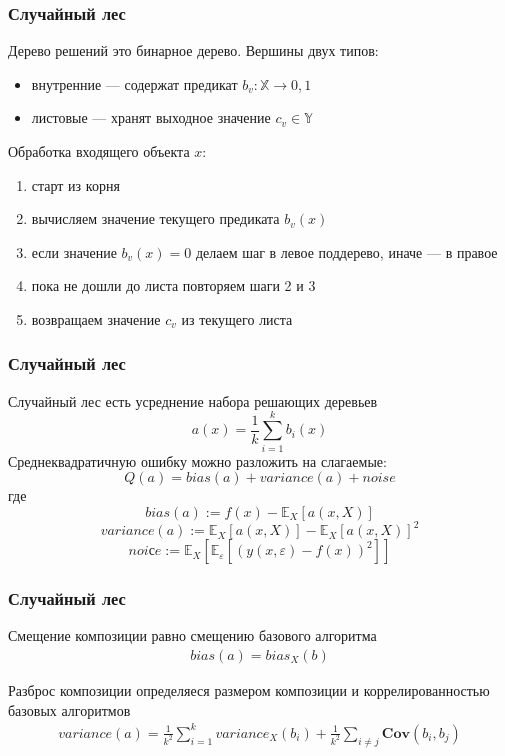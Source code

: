 \documentclass{beamer}
\newcommand{\COV}[2]{\textbf{Cov}\left(#1, #2\right)}
\renewcommand{\epsilon}{\varepsilon}
\begin{document}
\begin{frame}
    \frametitle{Случайный лес}

    Дерево решений это бинарное дерево.
    Вершины двух типов:
    \begin{itemize}
        \item внутренние --- содержат предикат $b_v: \mathbb{X} \rightarrow {0, 1}$
        \item листовые --- хранят выходное значение $c_v \in \mathbb{Y}$
    \end{itemize}

    Обработка входящего объекта $x$:
    \begin{enumerate}
        \item старт из корня
        \item вычисляем значение текущего предиката $b_v(x)$
        \item если значение $b_v(x) = 0$ делаем шаг в левое поддерево, иначе --- в правое
        \item пока не дошли до листа повторяем шаги 2 и 3
        \item возвращаем значение $c_v$ из текущего листа
    \end{enumerate}
\end{frame}

\begin{frame}
    \frametitle{Случайный лес}

    Случайный лес есть усреднение набора решающих деревьев
    \[
        a(x) = \frac{1}{k} \sum_{i=1}^{k} b_i(x)
    \]
    Среднеквадратичную ошибку можно разложить на слагаемые:
    \[
        Q(a) = bias(a) + variance(a) + noise
    \]
    где 
    \[
        bias(a) := f(x) - \mathbb{E}_X\left[a(x, X)\right]
    \]
    \[
        variance(a) := \mathbb{E}_X\left[a(x, X)\right] -\mathbb{E}_X\left[a(x, X)\right]^2
    \]
    \[
        noiсe := \mathbb{E}_X\left[\mathbb{E}_{\epsilon}\left[\left( y(x, \epsilon) - f(x) \right)^2\right]\right]
    \]
\end{frame}

\begin{frame}
    \frametitle{Случайный лес}

    Смещение композиции равно смещению базового алгоритма
    \begin{align*}
        bias(a) = bias_X(b)
    \end{align*}
    
    Разброс композиции определяеся размером композиции и коррелированностью базовых алгоритмов
    \begin{align*}
    	variance(a) =
         \frac{1}{k^2} \sum_{i=1}^{k} variance_X(b_i) + 
        \frac{1}{k^2} \sum_{i \ne j} \COV{b_i}{b_j}
    \end{align*}

\end{frame}
\end{document}
